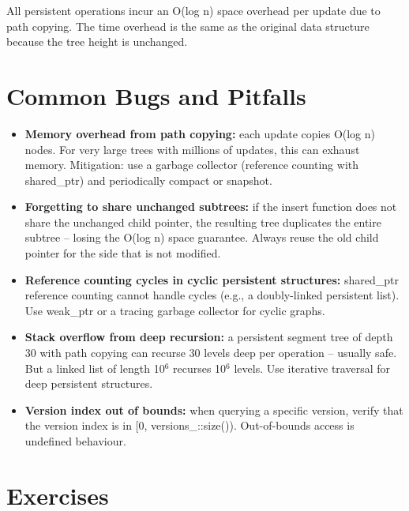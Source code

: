 All persistent operations incur an O(log n) space overhead per update due to path copying. The time overhead is the same as the original data structure because the tree height is unchanged.

\section{Common Bugs and Pitfalls}\label{sec21:pitfalls}

\begin{itemize}
\item \textbf{Memory overhead from path copying:} each update copies O(log n) nodes. For very large trees with millions of updates, this can exhaust memory. Mitigation: use a garbage collector (reference counting with shared\_ptr) and periodically compact or snapshot.

\item \textbf{Forgetting to share unchanged subtrees:} if the insert function does not share the unchanged child pointer, the resulting tree duplicates the entire subtree -- losing the O(log n) space guarantee. Always reuse the old child pointer for the side that is not modified.

\item \textbf{Reference counting cycles in cyclic persistent structures:} shared\_ptr reference counting cannot handle cycles (e.g., a doubly-linked persistent list). Use weak\_ptr or a tracing garbage collector for cyclic graphs.

\item \textbf{Stack overflow from deep recursion:} a persistent segment tree of depth 30 with path copying can recurse 30 levels deep per operation -- usually safe. But a linked list of length 10$^{6}$ recurses 10$^{6}$ levels. Use iterative traversal for deep persistent structures.

\item \textbf{Version index out of bounds:} when querying a specific version, verify that the version index is in [0, versions\_::size()). Out-of-bounds access is undefined behaviour.
\end{itemize}

\section{Exercises}\label{sec21:exercises}

